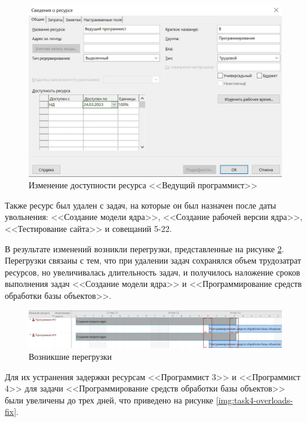 \begin{figure}[H]
	\begin{center}
		\includegraphics[scale=0.3]{inc/img/task4.jpg}
	\end{center}
	\captionsetup{justification=centering}
	\caption{Изменение доступности ресурса <<Ведущий программист>>}
	\label{img:task4}
\end{figure}

Также ресурс был удален с задач, на которые он был назначен после даты увольнения: <<Создание модели ядра>>, <<Создание рабочей версии ядра>>, <<Тестирование сайта>> и совещаний 5-22.

В результате изменений возникли перегрузки, представленные на рисунке \ref{img:task4-overloads}. Перегрузки связаны с тем, что при удалении задач сохранялся объем трудозатрат ресурсов, но увеличивалась длительность задач, и получилось наложение сроков выполнения задач <<Создание модели ядра>> и <<Программирование средств обработки базы объектов>>.

\begin{figure}[H]
	\begin{center}
		\includegraphics[scale=0.3]{inc/img/task4-overloads.jpg}
	\end{center}
	\captionsetup{justification=centering}
	\caption{Возникшие перегрузки}
	\label{img:task4-overloads}
\end{figure}

Для их устранения задержки ресурсам <<Программист 3>> и <<Программист 4>> для задачи <<Программирование средств обработки базы объектов>> были увеличены до трех дней, что приведено на рисунке \ref{img:task4-overloads-fix}.

